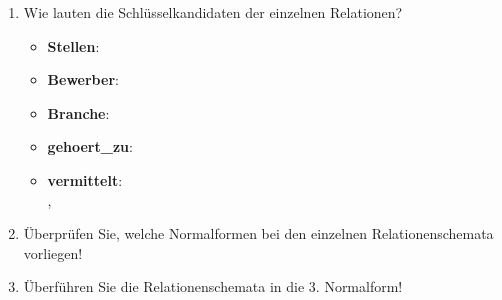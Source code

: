 \documentclass{lehramt-informatik-aufgabe}
\begin{document}
\begin{enumerate}
\item Wie lauten die Schlüsselkandidaten der
einzelnen Relationen?

\begin{liAntwort}
\begin{itemize}
\item \textbf{Stellen}: \\

\item \textbf{Bewerber}: \\

\item \textbf{Branche}: \\

\item \textbf{gehoert\_zu}: \\

\item \textbf{vermittelt}: \\
,  \\
\end{itemize}

\end{liAntwort}


\item Überprüfen Sie, welche Normalformen bei den einzelnen
Relationenschemata vorliegen!


\item Überführen Sie die Relationenschemata in die 3. Normalform!
\end{enumerate}
\end{document}
